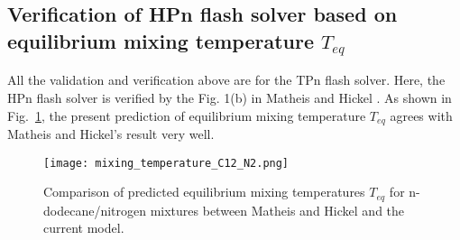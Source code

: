     \subsection{Verification of HPn flash solver based on equilibrium mixing temperature $T_{eq}$}
    All the validation and verification above are for the TPn flash solver. Here, the HPn flash solver is verified by the Fig. 1(b) in Matheis and Hickel \cite{matheis2018multi}. As shown in Fig.~\ref{v6}, the present prediction of equilibrium mixing temperature $T_{eq}$ agrees with Matheis and Hickel's result very well.
    \begin{figure}[htb]
        \begin{center}
            \texttt{[image: mixing\_temperature\_C12\_N2.png]}
        \end{center}
        \caption{Comparison of predicted equilibrium mixing temperatures $T_{eq}$ for n-dodecane/nitrogen mixtures between Matheis and Hickel \cite{matheis2018multi} and the current model.}
        \label{v6}
    \end{figure}

